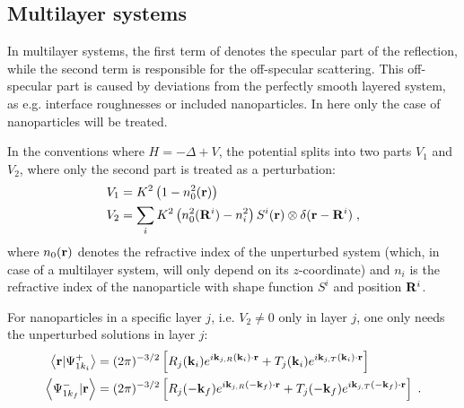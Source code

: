 \subsection{Multilayer systems}

In multilayer systems, the first term of  denotes the specular part of the reflection, while the second term is responsible for the off-specular scattering. This off-specular part is caused by deviations from the perfectly smooth layered system, as e.g. interface roughnesses or included nanoparticles. In here only the case of nanoparticles will be treated.

In the conventions where $H=-\Delta + V$, the potential splits into two parts $V_1$ and $V_2$, where only the second part is treated as a perturbation:
\begin{align*}
  V_1 & = K^2\left( 1-n_0^2(\mathbf{r})\right)  \\
  V_2 & = \sum_i K^2\left( n_0^2(\mathbf{R}^i) - n_i^2 \right) S^i(\mathbf{r}) \otimes \delta(\mathbf{r}-\mathbf{R}^i) \; ,
\end{align*}
where $n_0(\mathbf{r})$ denotes the refractive index of the unperturbed system (which, in case of a multilayer system, will only depend on its $z$-coordinate) and $n_i$ is the refractive index of the nanoparticle with shape function $S^i$ and position $\mathbf{R}^i$.

For nanoparticles in a specific layer $j$, i.e. $V_2\neq0$ only in layer $j$, one only needs the unperturbed solutions in layer $j$:
\begin{align*}
  \left\langle \mathbf{r} \vert \Psi^+_{1k_i} \right\rangle &= (2\pi)^{-3/2}\left[ R_j(\mathbf{k}_i) e^{i \mathbf{k}_{j,R}(\mathbf{k}_i)\cdot\mathbf{r}} + T_j(\mathbf{k}_i) e^{i \mathbf{k}_{j,T}(\mathbf{k}_i)\cdot\mathbf{r}} \right] \\
  \left\langle \Psi^-_{1k_f} \vert \mathbf{r} \right\rangle &= (2\pi)^{-3/2}\left[ R_j(-\mathbf{k}_f) e^{i \mathbf{k}_{j,R}(-\mathbf{k}_f)\cdot\mathbf{r}} + T_j(-\mathbf{k}_f) e^{i \mathbf{k}_{j,T}(-\mathbf{k}_f)\cdot\mathbf{r}} \right] \; .
\end{align*}

